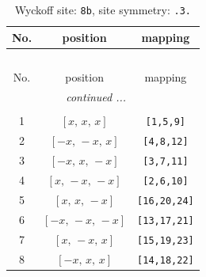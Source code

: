\documentclass[fleqn,8pt]{jsarticle}
\begin{document}
\renewcommand{\arraystretch}{1.2}
\begin{longtable}{ccc}
\caption{Wyckoff site: {\tt 8b}, site symmetry: {\tt .3.}}
 \\
 \hline \hline
No. & position & mapping \\ \hline \endfirsthead

\multicolumn{2}{l}{\tablename\ \thetable{}} \\
 \hline \hline
No. & position & mapping \\ \hline \endhead

 \hline \hline
\multicolumn{2}{r}{\footnotesize\it continued ...} \\ \endfoot

 \hline \hline
\multicolumn{2}{r}{} \\ \endlastfoot

1 & $\left[ x,\, x,\, x \right]$ & {\tt [1,5,9]} \\ \hline
2 & $\left[ - x,\, - x,\, x \right]$ & {\tt [4,8,12]} \\ \hline
3 & $\left[ - x,\, x,\, - x \right]$ & {\tt [3,7,11]} \\ \hline
4 & $\left[ x,\, - x,\, - x \right]$ & {\tt [2,6,10]} \\ \hline
5 & $\left[ x,\, x,\, - x \right]$ & {\tt [16,20,24]} \\ \hline
6 & $\left[ - x,\, - x,\, - x \right]$ & {\tt [13,17,21]} \\ \hline
7 & $\left[ x,\, - x,\, x \right]$ & {\tt [15,19,23]} \\ \hline
8 & $\left[ - x,\, x,\, x \right]$ & {\tt [14,18,22]} \\
\end{longtable}
\renewcommand{\arraystretch}{1.2}
\end{document}
